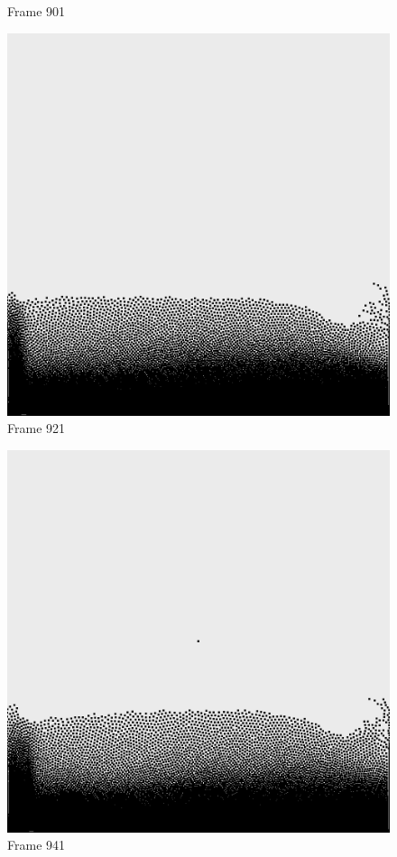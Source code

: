 \documentclass[a4paper, 12pt, oneside]{book}
\begin{document}
\begin{figure}[!ht]
\begin{center}
            Frame 901
        \end{center}
    \endminipage
    \hfill
        \begin{center}
            \includegraphics[width=\linewidth]{images/test_case_2/921.png}
            Frame 921
        \end{center}
    \endminipage
    \hfill
        \begin{center}
            \includegraphics[width=\linewidth]{images/test_case_2/941.png}
            Frame 941
        \end{center}
    \endminipage
    \hfill


\end{figure}
\end{document}
